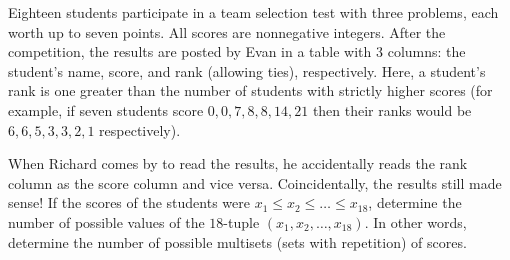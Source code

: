 Eighteen students participate in a team selection test with three problems, each worth up to seven points. All scores are nonnegative integers. After the competition, the results are posted by Evan in a table with 3 columns: the student's name, score, and rank (allowing ties), respectively. Here, a student's rank is one greater than the number of students with strictly higher scores (for example, if seven students score $0, 0, 7, 8, 8, 14, 21$ then their ranks would be $6, 6, 5, 3, 3, 2, 1$ respectively).

When Richard comes by to read the results, he accidentally reads the rank column as the score column and vice versa. Coincidentally, the results still made sense! If the scores of the students were $x_1 \le x_2 \le \dots \le x_{18}$, determine the number of possible values of the $18$-tuple $(x_1, x_2, \dots, x_{18})$. In other words, determine the number of possible multisets (sets with repetition) of scores.
